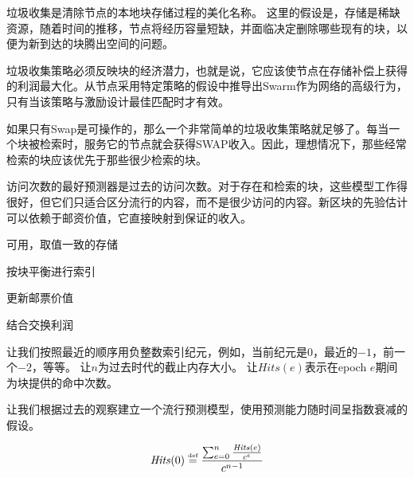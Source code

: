垃圾收集是清除节点的本地块存储过程的美化名称。 
这里的假设是，存储是稀缺资源，随着时间的推移，节点将经历容量短缺，并面临决定删除哪些现有的块，以便为新到达的块腾出空间的问题。 

垃圾收集策略必须反映块的经济潜力，也就是说，它应该使节点在存储补偿上获得的利润最大化。从节点采用特定策略的假设中推导出Swarm作为网络的高级行为，只有当该策略与激励设计最佳匹配时才有效。

如果只有Swap是可操作的，那么一个非常简单的垃圾收集策略就足够了。每当一个块被检索时，服务它的节点就会获得SWAP收入。因此，理想情况下，那些经常检索的块应该优先于那些很少检索的块。

访问次数的最好预测器是过去的访问次数。对于存在和检索的块，这些模型工作得很好，但它们只适合区分流行的内容，而不是很少访问的内容。新区块的先验估计可以依赖于邮资价值，它直接映射到保证的收入。  


可用，取值一致的存储

按块平衡进行索引

更新邮票价值 

结合交换利润 

让我们按照最近的顺序用负整数索引纪元，例如，当前纪元是0，最近的$-1$，前一个$-2$，等等。 
让$n$为过去时代的截止内存大小。
让$\mathit{Hits}(e)$表示在epoch $e$期间为块提供的命中次数。 

让我们根据过去的观察建立一个流行预测模型，使用预测能力随时间呈指数衰减的假设。 

\begin{equation}
    \mathit{Hits}(0) \overset{\textrm{\tiny def}}{=} \frac{\sum_{e=0}^n \frac{\mathit{Hits}(e)}{c^e}}{c^{n-1}}
\end{equation}